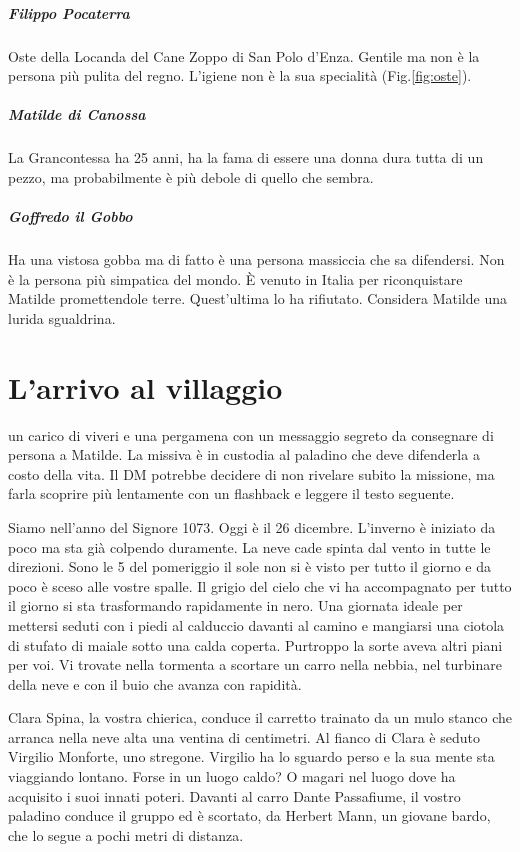 \documentclass[letterpaper,twocolumn,openany,nodeprecatedcode]{dndbook}
\begin{document}
\paragraph{Filippo Pocaterra} Oste della Locanda del Cane Zoppo di San Polo d'Enza. Gentile ma non è la persona più pulita del regno. L'igiene non è la sua specialità (Fig.\ref{fig:oste}).

\paragraph{Matilde di Canossa} La Grancontessa ha 25 anni, ha la fama di essere una donna dura tutta di un pezzo, ma probabilmente è più debole di quello che sembra.

\paragraph{Goffredo il Gobbo} Ha una vistosa gobba ma di fatto è una persona massiccia che sa difendersi. Non è la persona più simpatica del mondo. È venuto in Italia per riconquistare Matilde promettendole terre. Quest'ultima lo ha rifiutato. Considera Matilde una lurida sgualdrina.


\chapter{L'arrivo al villaggio}
 un carico di viveri e una pergamena con un messaggio segreto da consegnare di persona a Matilde. La missiva è in custodia al paladino che deve difenderla a costo della vita. Il DM potrebbe decidere di non rivelare subito la missione, ma farla scoprire più lentamente con un flashback e leggere il testo seguente.

\begin{DndReadAloud}
Siamo nell'anno del Signore 1073. Oggi è il 26 dicembre. L'inverno è iniziato da poco ma sta già colpendo duramente. La neve cade spinta dal vento in tutte le direzioni. Sono le 5 del pomeriggio il sole non si è visto per tutto il giorno e da poco è sceso alle vostre spalle. Il grigio del cielo che vi ha accompagnato per tutto il giorno si sta trasformando rapidamente in nero. Una giornata ideale per mettersi seduti con i piedi al calduccio davanti al camino e mangiarsi una ciotola di stufato di maiale sotto una calda coperta. Purtroppo la sorte aveva altri piani per voi. Vi trovate nella tormenta a scortare un carro nella nebbia, nel turbinare della neve e con il buio che avanza con rapidità.

Clara Spina, la vostra chierica, conduce il carretto trainato da un mulo stanco che arranca nella neve alta una ventina di centimetri. Al fianco di Clara è seduto Virgilio Monforte, uno stregone. Virgilio ha lo sguardo perso e la sua mente sta viaggiando lontano. Forse in un luogo caldo? O magari nel luogo dove ha acquisito i suoi innati poteri. Davanti al carro Dante Passafiume, il vostro paladino conduce il gruppo ed è scortato, da Herbert Mann, un giovane bardo, che lo segue a pochi metri di distanza. 
\end{DndReadAloud}
\end{document}

